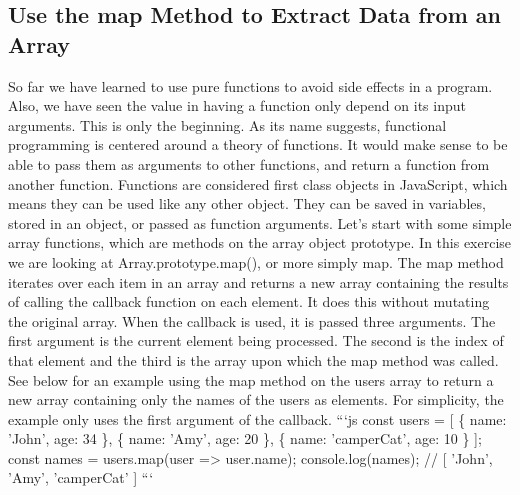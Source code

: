 \documentclass{article}%
\begin{document}
\subsection{Use the map Method to Extract Data from an Array}%
\label{subsec:UsethemapMethodtoExtractDatafromanArray}%
So far we have learned to use pure functions to avoid side effects in a program. Also, we have seen the value in having a function only depend on its input arguments.\newline%
This is only the beginning. As its name suggests, functional programming is centered around a theory of functions.\newline%
It would make sense to be able to pass them as arguments to other functions, and return a function from another function. Functions are considered first class objects in JavaScript, which means they can be used like any other object. They can be saved in variables, stored in an object, or passed as function arguments.\newline%
Let's start with some simple array functions, which are methods on the array object prototype. In this exercise we are looking at Array.prototype.map(), or more simply map.\newline%
The map method iterates over each item in an array and returns a new array containing the results of calling the callback function on each element.  It does this without mutating the original array.\newline%
When the callback is used, it is passed three arguments.  The first argument is the current element being processed.  The second is the index of that element and the third is the array upon which the map method was called.\newline%
See below for an example using the map method on the users array to return a new array containing only the names of the users as elements. For simplicity, the example only uses the first argument of the callback.\newline%
```js\newline%
const users = {[}\newline%
  \{ name: 'John', age: 34 \},\newline%
  \{ name: 'Amy', age: 20 \},\newline%
  \{ name: 'camperCat', age: 10 \}\newline%
{]};\newline%
const names = users.map(user => user.name);\newline%
console.log(names); // {[} 'John', 'Amy', 'camperCat' {]}\newline%
```\newline%
\end{document}
